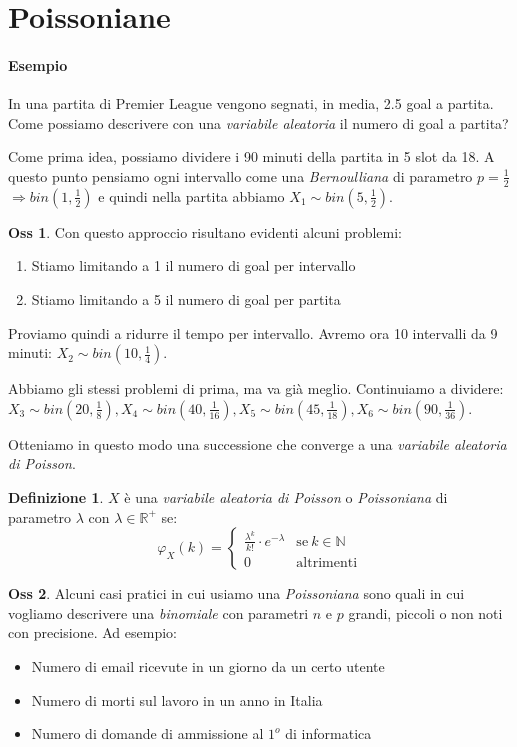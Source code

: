 \documentclass[12pt, a4paper]{report}
\theoremstyle{definition}
\newtheorem{definition}{Definizione}[section]
\newtheorem*{observation}{Oss}
\DeclareRobustCommand{\R}{\mathbb{R}}%
\DeclareRobustCommand{\N}{\mathbb{N}}%
\begin{document}
\section{Poissoniane}

\paragraph*{Esempio}
In una partita di Premier League vengono segnati, in media, 2.5 goal a partita.
Come possiamo descrivere con una \emph{variabile aleatoria} il numero di goal a
partita?

Come prima idea, possiamo dividere i 90 minuti della partita in 5 slot da 18. A
questo punto pensiamo ogni intervallo come una \emph{Bernoulliana} di parametro
$p=\frac{1}{2}$ \(\Rightarrow bin(1, \frac{1}{2})\) e quindi nella partita
abbiamo \(X_1\sim bin(5,\frac{1}{2})\).
\begin{observation}
	Con questo approccio risultano evidenti alcuni problemi:
	\begin{enumerate}[label=(\roman*)]
		\item Stiamo limitando a 1 il numero di goal per intervallo
		\item Stiamo limitando a 5 il numero di goal per partita
	\end{enumerate}
\end{observation}

Proviamo quindi a ridurre il tempo per intervallo. Avremo ora 10 intervalli
da 9 minuti: \(X_2\sim bin(10, \frac{1}{4})\).

Abbiamo gli stessi problemi di prima, ma va già meglio. Continuiamo a dividere:
\(X_3\sim bin(20,\frac{1}{8}),X_4\sim bin(40,\frac{1}{16}), X_5\sim bin(45,\frac
{1}{18}), X_6\sim bin(90,\frac{1}{36})\).

Otteniamo in questo modo una successione che converge a una \emph{variabile
aleatoria di Poisson}.

\begin{definition}
	$X$ è una \emph{variabile aleatoria di Poisson} o \emph{Poissoniana} di
	parametro $\lambda$ con  $\lambda\in\R^+$ se:
	\[\varphi_X(k)=\begin{cases}
		{\frac{\lambda^k}{k!}\cdot e^{-\lambda}} & \text{se}\ {k\in\N}\\
		{0} & \text{altrimenti}
	\end{cases}\]
\end{definition}

\begin{observation}
	Alcuni casi pratici in cui usiamo una \emph{Poissoniana} sono quali in cui
	vogliamo descrivere una \emph{binomiale} con parametri $n$ e $p$ grandi,
	piccoli o non noti con precisione. Ad esempio:
	\begin{itemize}
		\item Numero di email ricevute in un giorno da un certo utente
		\item Numero di morti sul lavoro in un anno in Italia
		\item Numero di domande di ammissione al $1^o$ di informatica
	\end{itemize}
\end{observation}
\end{document}
